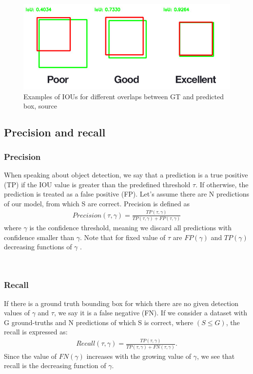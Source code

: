 \begin{figure}
    \includegraphics[width = \linewidth]{images/IOU.jpg}
    \caption{Examples of IOUs for different overlaps between GT and predicted box, source \cite{Cowton2019}}
    \label{fig:iou}
\end{figure}

\subsection{Precision and recall}
\subsubsection{Precision}
\label{subsec:precision}
When speaking about object detection, we say that a prediction is a true positive (TP) if the IOU value is greater than the predefined threshold $\tau$. If otherwise, the prediction is treated as a false positive (FP). Let's assume there are N predictions of our model, from which S are correct. Precision is defined as
\begin{align}
    Precision(\tau, \gamma) = \frac{TP(\tau, \gamma)}{TP(\tau, \gamma) + FP(\tau, \gamma)}
\end{align}
where $\gamma$ is the confidence threshold, meaning we discard all predictions with confidence smaller than $\gamma$. Note that for fixed value of $\tau$ are $FP(\gamma)$ and $TP(\gamma)$ decreasing functions of $\gamma$ \cite{Padilla2021}.

\

\subsubsection{Recall}
\label{subsec:recall}
If there is a ground truth bounding box for which there are no given detection values of $\gamma$ and $\tau$, we say it is a false negative (FN). If we consider a dataset with G ground-truths and N predictions of which S is correct, where $(S \leq G)$, the recall is expressed as:
\begin{align}
    Recall(\tau, \gamma) = \frac{TP(\tau, \gamma)}{ TP(\tau, \gamma) + FN(\tau, \gamma)}.
\end{align}
Since the value of $FN(\gamma)$ increases with the growing value of $\gamma$, we see that recall is the decreasing function of $\gamma$.

